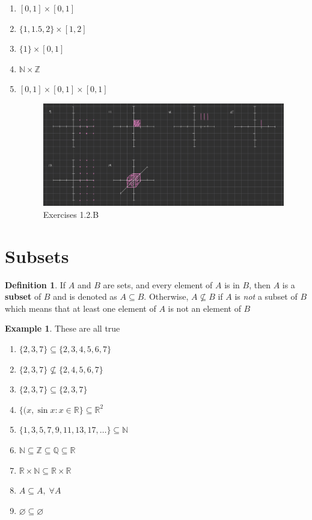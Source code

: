 \documentclass[10pt]{article}
\newcommand{\R}{\mathbb{R}}
\newcommand{\N}{\mathbb{N}}
\newcommand{\Z}{\mathbb{Z}}
\newcommand{\Q}{\mathbb{Q}}
\theoremstyle{definition}
\newtheorem{example}{Example}
\newtheorem{definition}{Definition}
\begin{document}
\begin{enumerate}[label=\Alph*.]
\begin{enumerate}[label=\arabic*.]
            \item $[0,1]\times[0,1]$
            \item $\{1,1.5,2\}\times[1,2]$
            \item $\{1\}\times[0,1]$
            \item $\N \times \Z$
            \item $[0,1]\times[0,1]\times[0,1]$
                \begin{figure}
                    \centering
                    \includegraphics[width=0.75\linewidth]{images/exercise_1_2_B.jpg}
                    \caption{Exercises 1.2.B}
                \end{figure}
        \end{enumerate}
\end{enumerate}

\section{Subsets}
\begin{definition}
    If $A$ and $B$ are sets, and every element of $A$ is in $B$, then $A$ is a \textbf{subset} of $B$ and is denoted as $A \subseteq B$. Otherwise, $A \not\subseteq B$ if $A$ is \textit{not} a subset of $B$ which means that at least one element of $A$ is not an element of $B$
\end{definition}

\begin{example} These are all true
    \begin{enumerate}
        \item $\{2,3,7\} \subseteq \{2,3,4,5,6,7\}$
        \item $\{2,3,7\} \not\subseteq \{2,4,5,6,7\}$
        \item $\{2,3,7\} \subseteq \{2,3,7\}$
        \item $\{(x,\sin{x}: x\in\R\} \subseteq \R^2$
            \item $\{1,3,5,7,9,11,13,17,\dots\} \subseteq \N$
            \item $\N \subseteq \Z \subseteq \Q \subseteq \R$
            \item $\R \times \N \subseteq \R \times \R$
            \item $A \subseteq A, \; \forall A$
            \item $\varnothing \subseteq \varnothing$
        \end{enumerate}
    \end{example}
\end{document}
